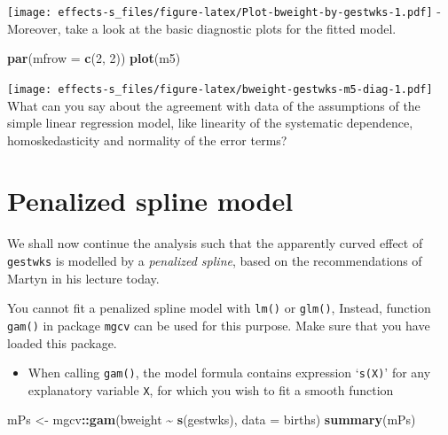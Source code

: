 \documentclass[
]{book}
\newenvironment{Shaded}{\begin{snugshade}}{\end{snugshade}}
\newcommand{\AttributeTok}[1]{\textcolor[rgb]{0.13,0.29,0.53}{#1}}
\newcommand{\DecValTok}[1]{\textcolor[rgb]{0.00,0.00,0.81}{#1}}
\newcommand{\FunctionTok}[1]{\textcolor[rgb]{0.13,0.29,0.53}{\textbf{#1}}}
\newcommand{\NormalTok}[1]{#1}
\newcommand{\OtherTok}[1]{\textcolor[rgb]{0.56,0.35,0.01}{#1}}
\newcommand{\SpecialCharTok}[1]{\textcolor[rgb]{0.81,0.36,0.00}{\textbf{#1}}}
\providecommand{\tightlist}{%
  \setlength{\itemsep}{0pt}\setlength{\parskip}{0pt}}
\begin{document}
\texttt{[image: effects-s\_files/figure-latex/Plot-bweight-by-gestwks-1.pdf]}
- Moreover, take a look at the basic diagnostic plots for the fitted model.

\begin{Shaded}
\begin{Highlighting}[]
\FunctionTok{par}\NormalTok{(}\AttributeTok{mfrow =} \FunctionTok{c}\NormalTok{(}\DecValTok{2}\NormalTok{, }\DecValTok{2}\NormalTok{))}
\FunctionTok{plot}\NormalTok{(m5)}
\end{Highlighting}
\end{Shaded}

\texttt{[image: effects-s\_files/figure-latex/bweight-gestwks-m5-diag-1.pdf]}
What can you say about the agreement with data of the assumptions of the
simple linear regression model,
like linearity of the systematic dependence,
homoskedasticity and normality of the error terms?

\section{Penalized spline model}\label{penalized-spline-model}

We shall now continue the analysis such that the apparently curved effect
of \texttt{gestwks} is modelled by a \emph{penalized spline},
based on the recommendations of Martyn in his lecture today.

You cannot fit a penalized spline model with \texttt{lm()} or
\texttt{glm()}, Instead, function \texttt{gam()} in package
\texttt{mgcv} can be used for this purpose. Make sure that you have loaded
this package.

\begin{itemize}
\tightlist
\item
  When calling \texttt{gam()}, the model formula contains
  expression `\texttt{s(X)}' for any explanatory variable \texttt{X},
  for which you wish to fit a smooth function
\end{itemize}

\begin{Shaded}
\begin{Highlighting}[]
\NormalTok{mPs }\OtherTok{\textless{}{-}}\NormalTok{ mgcv}\SpecialCharTok{::}\FunctionTok{gam}\NormalTok{(bweight }\SpecialCharTok{\textasciitilde{}} \FunctionTok{s}\NormalTok{(gestwks), }\AttributeTok{data =}\NormalTok{ births)}
\FunctionTok{summary}\NormalTok{(mPs)}
\end{Highlighting}
\end{Shaded}
\end{document}
